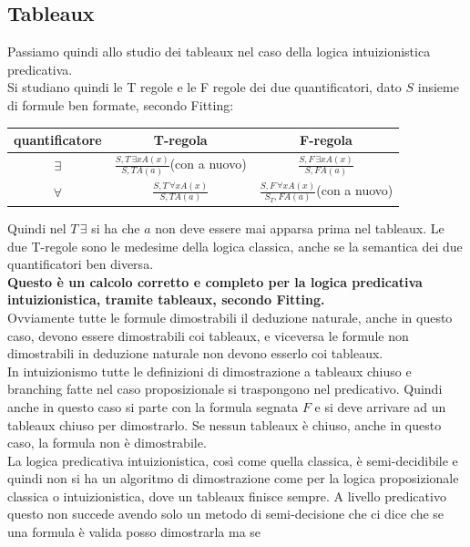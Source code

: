 \documentclass[a4paper,12pt, oneside]{book}
\begin{document}
\subsection{Tableaux}
Passiamo quindi allo studio dei tableaux nel caso della logica intuizionistica
predicativa. \\
Si studiano quindi le T regole e le F regole dei due quantificatori, dato $S$
insieme di formule ben formate, secondo Fitting:
\begin{table}[H]
  \centering
  \Large
  \begin{tabular}{c||c|c}
    quantificatore & T-regola & F-regola\\
    \hline
    $\exists$ & $\frac{S,T\,\exists x A(x)}{S,TA(a)}${\small{(con a nuovo)}}
                             & $\frac{S,F\,\exists x A(x)}{S,FA(a)}$\\
    $\forall$ & $\frac{S,T\,\forall x A(x)}{S,TA(a)}$
                              & $\frac{S,F\,\forall x A(x)}{S_T,
                                FA(a)}${\small{(con a nuovo)}}\\
    \hline
  \end{tabular}
\end{table}
Quindi nel $T\,\exists$ si ha che $a$ non deve essere mai apparsa prima nel
tableaux. Le due T-regole sono le medesime della logica classica, anche se la
semantica dei due quantificatori ben diversa.\\
\textbf{Questo è un calcolo corretto e completo per la logica predicativa
  intuizionistica, tramite tableaux, secondo Fitting.}\\
Ovviamente tutte le formule dimostrabili il deduzione naturale, anche in questo
caso, devono essere dimostrabili coi tableaux, e viceversa le formule non
dimostrabili in deduzione naturale non devono esserlo coi tableaux.\\
In intuizionismo tutte le definizioni di dimostrazione a tableaux chiuso e
branching fatte nel caso proposizionale si traspongono nel predicativo. Quindi
anche in questo caso si parte con la formula segnata $F$ e si deve arrivare ad
un tableaux chiuso per dimostrarlo. Se nessun tableaux è chiuso, anche in questo
caso, la formula non è dimostrabile.\\
La logica predicativa intuizionistica, così come quella classica, è
semi-decidibile e quindi non si ha un algoritmo di dimostrazione come per la
logica proposizionale classica o intuizionistica, dove un tableaux finisce
sempre. A livello predicativo questo non succede avendo solo un metodo di
semi-decisione che ci dice che se una formula è valida posso dimostrarla ma se
\end{document}
